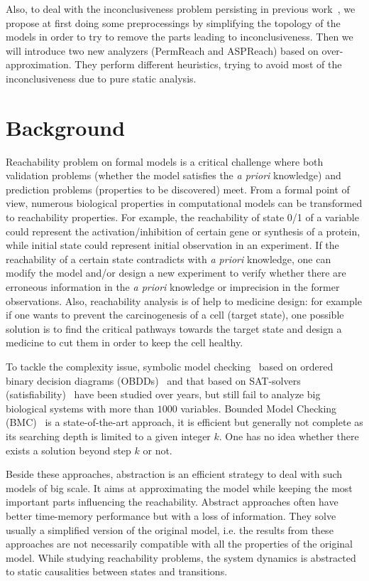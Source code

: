 Also, to deal with the inconclusiveness problem persisting in previous work~\cite{folschette2015}, we propose at first doing some preprocessings by simplifying the topology of the models in order to try to remove the parts leading to inconclusiveness.
Then we will introduce two new analyzers (PermReach and ASPReach) based on over-approximation.
They perform different heuristics, trying to avoid most of the inconclusiveness due to pure static analysis.

\section{Background}
Reachability problem on formal models is a critical challenge where both validation problems (whether the model satisfies the \textit{a priori} knowledge) and prediction problems (properties to be discovered) meet. 
From a formal point of view, numerous biological properties in computational models can be transformed to reachability properties. 
For example, the reachability of state 0/1 of a variable could represent the activation/inhibition of certain gene or synthesis of a protein, while initial state could represent initial observation in an experiment.
If the reachability of a certain state contradicts with \textit{a priori} knowledge, one can modify the model and/or design a new experiment to verify whether there are erroneous information in the \textit{a priori} knowledge or imprecision in the former observations.
Also, reachability analysis is of help to medicine design: for example if one wants to prevent the carcinogenesis of a cell (target state), one possible solution is to find the critical pathways towards the target state and design a medicine to cut them in order to keep the cell healthy.

To tackle the complexity issue, symbolic model checking~\cite{burch1992symbolic} based on ordered binary decision diagrams (OBDDs)~\cite{hardin1997new} and that based on SAT-solvers (satisfiability)~\cite{abdulla2000symbolic} have been studied over years, but still fail to analyze big biological systems with more than $1000$ variables. 
Bounded Model Checking (BMC)~\cite{clarke2001bounded} is a state-of-the-art approach, it is efficient but generally not complete as its searching depth is limited to a given integer $k$.
One has no idea whether there exists a solution beyond step $k$ or not.

Beside these approaches, abstraction is an efficient strategy to deal with such models of big scale. 
It aims at approximating the model while keeping the most important parts influencing the reachability.
Abstract approaches often have better time-memory performance but with a loss of information. 
They solve usually a simplified version of the original model, i.e. the results from these approaches are not necessarily compatible with all the properties of the original model.
While studying reachability problems, the system dynamics is abstracted to static causalities between states and transitions.

